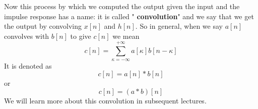Now this process by which we computed the output given the input and the impulse response has a name: it is called "\textbf{ convolution}" and we say that we get the output by convolving $x[n]$ and $h[n]$. So in general, when we say $a[n]$ convolves with $b[n]$ to give $c[n]$ we mean
\begin{equation}
c[n]=\sum_{\kappa=-\infty}^{+\infty} a[\kappa]b[n-\kappa] \nonumber
\end{equation}
It is denoted as
\begin{equation}
c[n]=a[n]*b[n]
\end{equation}
or
\begin{equation}
c[n]=(a\ast b)[n]
\end{equation}
We will learn more about this convolution in subsequent lectures.

